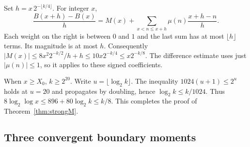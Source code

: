 Set $h=x\,2^{-\lfloor k/4\rfloor}$. For integer $x$,
\[
 \frac{B(x+h)-B(x)}h
 = M(x)+\sum_{x<n\le x+h}\mu(n)\frac{x+h-n}{h}.
\]
Each weight on the right is between $0$ and $1$ and the last sum has
at most $\lfloor h\rfloor$ terms. Its magnitude is at most $h$.
Consequently $|M(x)|\le8x^2 2^{-k/2}/h+h\le10x2^{-k/4}
\le x2^{-k/8}$. The difference estimate uses just $|\mu(n)|\le1$,
so it applies to these signed coefficients.

When $x\ge X_0$, $k\ge2^{20}$. Write $u=\lfloor\log_2 k\rfloor$.
The inequality $1024(u+1)\le2^u$ holds at $u=20$ and propagates by
doubling, hence $\log_2 k\le k/1024$. Thus
$8\log_2\log x\le896+80\log_2 k\le k/8$. This completes the proof
of Theorem~\ref{thm:strongM}.

\subsection{Three convergent boundary moments}

